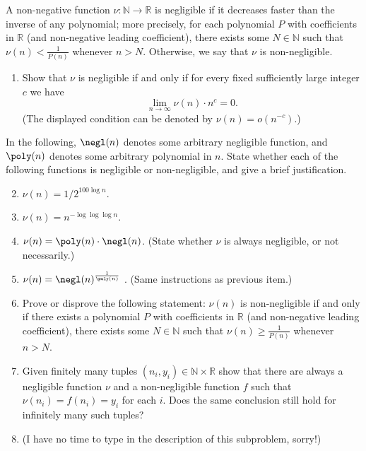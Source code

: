 

\begin{problem}\label{p1}
A non-negative function $\nu \colon \mathbb{N} \to \mathbb{R}$  is negligible 
if it decreases faster than the inverse of any polynomial; 
more precisely, for each polynomial $P$ with coefficients in  $ \mathbb{R}$ (and non-negative leading coefficient), there exists some $N\in\mathbb{N}$ such that $\nu(n) <\frac{1}{P(n)}$ whenever $n>N$.  Otherwise, we say that $\nu$ is non-negligible.

\begin{enumerate}[label=(\roman*)]
    \item Show that  $\nu$ is negligible if and only if for every fixed sufficiently large integer $c$ we have 
    \[
    \lim_{n \to \infty} \nu(n) \cdot n^c = 0.
    \](The displayed condition can be denoted by  $\nu(n) = o(n^{-c})$.)
\end{enumerate}
In the following, $\negl(n)$ denotes some arbitrary negligible function, 
and $\poly(n)$ denotes some arbitrary polynomial in $n$. State whether each of the following functions is negligible or non-negligible, and give a brief justification.
\begin{enumerate}[label=(\roman*)]
    \setcounter{enumii}{1}
    \item  $\nu(n) = 1/2^{100 \log n}$.
    \item  $\nu(n) = n^{- \log \log \log n}$.
    \item $\nu(n) = \poly(n) \cdot \negl(n)$. 
    (State whether $\nu$ is always negligible, or not necessarily.)
    \item $\nu(n) = \negl(n)^{\frac{1}{\poly(n)}}$
    . (Same instructions as previous item.)

    \item Prove or disprove the following statement: $\nu(n)$ is non-negligible if and only if there exists a polynomial $P$ with coefficients in $\mathbb{R}$ (and non-negative leading coefficient), there exists some $N \in \mathbb{N}$ such that $\nu(n) \geq \frac{1}{P(n)}$ whenever $n>N$.

    \item Given finitely many tuples $(n_i, y_i)\in \mathbb{N}\times  \mathbb{R}$ show that there are always a negligible function $\nu$ and a non-negligible function $f$ such that $\nu(n_i)=f(n_i)=y_i$ for each $i$. Does the same conclusion still hold for infinitely many such tuples?

    \item (I have no time to type in the description of this subproblem, sorry!)
\end{enumerate}
\end{problem}
